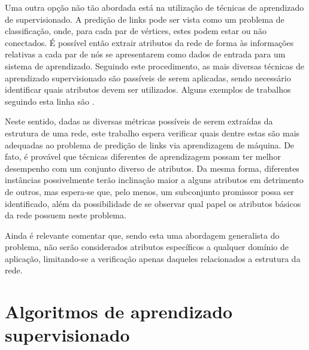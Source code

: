 \documentclass[a4paper,11pt]{article}
\begin{document}
Uma outra opção não tão abordada está na utilização de técnicas de aprendizado de supervisionado. A predição de links pode ser vista como um problema de classificação, onde, para cada par de vértices, estes podem estar ou não conectados. É possível então extrair atributos da rede de forma às informações relativas a cada par de nós se apresentarem como dados de entrada para um sistema de aprendizado. Seguindo este procedimento, as mais diversas técnicas de aprendizado supervisionado são passíveis de serem aplicadas, sendo necessário identificar quais atributos devem ser utilizados. Alguns exemplos de trabalhos seguindo esta linha são \cite{Mohammad06, Benchettara10, Cukierski11, Sa11}.



Neste sentido, dadas as diversas métricas possíveis de serem extraídas da estrutura de uma rede, este trabalho espera verificar quais dentre estas são mais adequadas ao problema de predição de links via aprendizagem de máquina. De fato, é provável que técnicas diferentes de aprendizagem possam ter melhor desempenho com um conjunto diverso de atributos. Da mesma forma, diferentes instâncias possivelmente terão inclinação maior a alguns atributos em detrimento de outros, mas espera-se que, pelo menos, um subconjunto promissor possa ser identificado, além da possibilidade de se observar qual papel os atributos básicos da rede possuem neste problema.

Ainda é relevante comentar que, sendo esta uma abordagem generalista do problema, não serão considerados atributos específicos a qualquer domínio de aplicação, limitando-se a verificação apenas daqueles relacionados a estrutura da rede.


\vspace{0.5cm}
\section{Algoritmos de aprendizado supervisionado}
\vspace{0.5cm}
\end{document}
